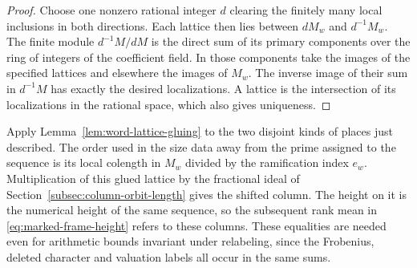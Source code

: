 \begin{proof}
Choose one nonzero rational integer \(d\) clearing the
finitely many local inclusions in both directions. Each
lattice then lies between \(dM_w\) and \(d^{-1}M_w\).
The finite module \(d^{-1}M/dM\) is the direct sum of its
primary components over the ring of integers of the
coefficient field. In those components take the images of
the specified lattices and elsewhere the images of \(M_w\).
The inverse image of their sum in \(d^{-1}M\) has exactly
the desired localizations. A lattice is the intersection of its
localizations in the rational space, which also gives uniqueness.
\end{proof}

Apply Lemma~\ref{lem:word-lattice-gluing} to the two disjoint kinds of
places just described. The order used in the size data
away from the prime assigned to the sequence is its local colength in \(M_w\)
divided by the ramification index \(e_w\). Multiplication
of this glued lattice by the fractional ideal of
Section~\ref{subsec:column-orbit-length} gives the shifted
column. The height on it is the numerical height of the
same sequence, so the subsequent rank mean in
\eqref{eq:marked-frame-height} refers to these columns.
These equalities are needed even for
arithmetic bounds invariant under relabeling, since the
Frobenius, deleted character and valuation labels all occur
in the same sums. \label{cor:window-points-3}



